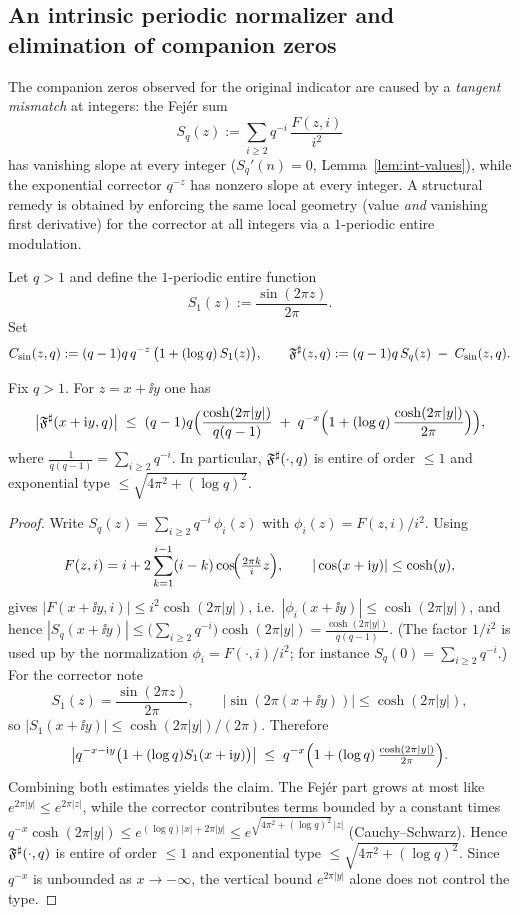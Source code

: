 \subsection{An intrinsic periodic normalizer and elimination of companion zeros}\label{sec:periodic-normalizer}
The companion zeros observed for the original indicator are caused by a \emph{tangent mismatch} at integers: the Fej\'er sum
\[
S_q(z):=\sum_{i\ge2} q^{-i}\,\frac{F(z,i)}{i^2}
\]
has vanishing slope at every integer ($S_q'(n)=0$, Lemma~\ref{lem:int-values}), while the exponential corrector $q^{-z}$ has nonzero slope at every integer. A structural remedy is obtained by enforcing the same local geometry (value \emph{and} vanishing first derivative) for the corrector at all integers via a $1$-periodic entire modulation.

\begin{definition}\label{def:periodic-normalizer}
Let $q>1$ and define the $1$-periodic entire function
\[
S_1(z):=\frac{\sin(2\pi z)}{2\pi}.
\]
Set
\[
C_{\sin}(z,q):=(q-1)q\,q^{-z}\,\bigl(1+(\log q)\,S_1(z)\bigr),
\qquad
\mathfrak F^{\sharp}(z,q):=(q-1)q\,S_q(z)\;-\;C_{\sin}(z,q).
\]
\end{definition}

\begin{lemma}\label{lem:fsharp-growth-corrected}
Fix $q>1$. For $z=x+\ii y$ one has
\[
\bigl|\mathfrak F^{\sharp}(x+\mathrm{i} y,q)\bigr|
\;\le\; (q-1)q\Bigl(\frac{\cosh(2\pi |y|)}{q(q-1)}\;+\;q^{-x}\Bigl(1+(\log q)\,\frac{\cosh(2\pi|y|)}{2\pi}\Bigr)\Bigr),
\]
where $\frac{1}{q(q-1)}=\sum_{i\ge2}q^{-i}$. In particular, $\mathfrak F^{\sharp}(\cdot,q)$ is entire of order $\le 1$ and exponential type $\le \sqrt{4\pi^2+(\log q)^2}$.
\end{lemma}

\begin{proof}
Write $S_q(z)=\sum_{i\ge2}q^{-i}\,\phi_i(z)$ with $\phi_i(z)=F(z,i)/i^2$. Using
\[
F(z,i)=i+2\sum_{k=1}^{i-1}(i-k)\cos\!\Bigl(\tfrac{2\pi k}{i}z\Bigr),
\qquad
|\cos(x+\mathrm{i} y)|\le \cosh(y),
\]
gives $|F(x+\ii y,i)|\le i^2\cosh(2\pi|y|)$, i.e.\ $|\phi_i(x+\ii y)|\le\cosh(2\pi|y|)$, and hence $|S_q(x+\ii y)|\le \bigl(\sum_{i\ge2}q^{-i}\bigr)\cosh(2\pi|y|)=\frac{\cosh(2\pi|y|)}{q(q-1)}$. (The factor $1/i^2$ is used up by the normalization $\phi_i=F(\cdot,i)/i^2$; for instance $S_q(0)=\sum_{i\ge2}q^{-i}$.)
For the corrector note
\[
S_1(z)=\frac{\sin(2\pi z)}{2\pi},
\qquad
|\sin(2\pi(x+\ii y))|\le \cosh(2\pi|y|),
\]
so $|S_1(x+\ii y)|\le \cosh(2\pi|y|)/(2\pi)$. Therefore
\[
\bigl|q^{-x-\mathrm{i} y}\bigl(1+(\log q)S_1(x+\mathrm{i} y)\bigr)\bigr|
\;\le\;q^{-x}\Bigl(1+(\log q)\,\tfrac{\cosh(2\pi|y|)}{2\pi}\Bigr).
\]
Combining both estimates yields the claim. The Fej\'er part grows at most like $e^{2\pi|y|}\le e^{2\pi|z|}$, while the corrector contributes terms bounded by a constant times $q^{-x}\cosh(2\pi|y|)\le e^{(\log q)|x|+2\pi|y|}\le e^{\sqrt{4\pi^2+(\log q)^2}\,|z|}$ (Cauchy--Schwarz). Hence $\mathfrak F^{\sharp}(\cdot,q)$ is entire of order $\le 1$ and exponential type $\le\sqrt{4\pi^2+(\log q)^2}$. Since $q^{-x}$ is unbounded as $x\to-\infty$, the vertical bound $e^{2\pi|y|}$ alone does not control the type.
\end{proof}

